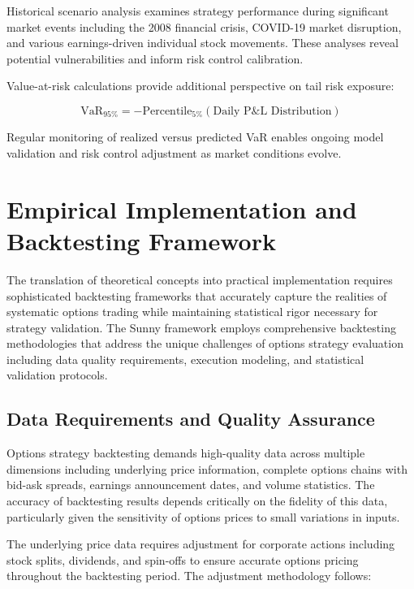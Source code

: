\documentclass[
  american,
  11pt,
  11pt,
  letterpaper,
  onecolumn]{article}
\begin{document}
Historical scenario analysis examines strategy performance during
significant market events including the 2008 financial crisis, COVID-19
market disruption, and various earnings-driven individual stock
movements. These analyses reveal potential vulnerabilities and inform
risk control calibration.

Value-at-risk calculations provide additional perspective on tail risk
exposure:

\[\text{VaR}_{95\%} = -\text{Percentile}_{5\%}(\text{Daily P\&L Distribution})\]

Regular monitoring of realized versus predicted VaR enables ongoing
model validation and risk control adjustment as market conditions
evolve.

\section{Empirical Implementation and Backtesting
Framework}\label{empirical-implementation-and-backtesting-framework}

The translation of theoretical concepts into practical implementation
requires sophisticated backtesting frameworks that accurately capture
the realities of systematic options trading while maintaining
statistical rigor necessary for strategy validation. The Sunny framework
employs comprehensive backtesting methodologies that address the unique
challenges of options strategy evaluation including data quality
requirements, execution modeling, and statistical validation protocols.

\subsection{Data Requirements and Quality
Assurance}\label{data-requirements-and-quality-assurance}

Options strategy backtesting demands high-quality data across multiple
dimensions including underlying price information, complete options
chains with bid-ask spreads, earnings announcement dates, and volume
statistics. The accuracy of backtesting results depends critically on
the fidelity of this data, particularly given the sensitivity of options
prices to small variations in inputs.

The underlying price data requires adjustment for corporate actions
including stock splits, dividends, and spin-offs to ensure accurate
options pricing throughout the backtesting period. The adjustment
methodology follows:
\end{document}
